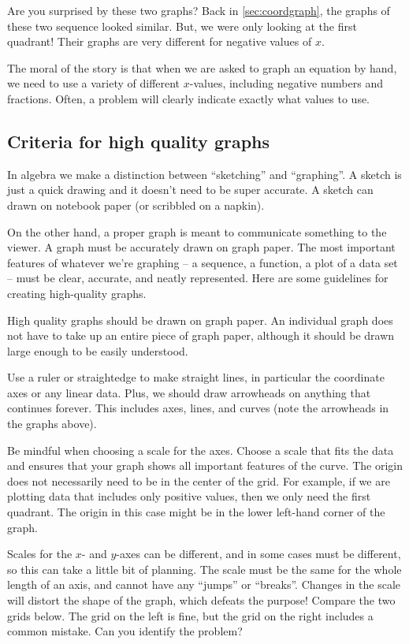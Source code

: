 Are you surprised by these two graphs? Back in \cref{sec:coordgraph}, the graphs of these two sequence looked similar. But, we were only looking at the first quadrant! Their graphs are very different for negative values of $x$.

The moral of the story is that when we are asked to graph an equation by hand, we need to use a variety of different $x$-values, including negative numbers and fractions. Often, a problem will clearly indicate exactly what values to use.

\subsection{Criteria for high quality graphs}

In algebra we make a distinction between ``sketching'' and ``graphing''. A sketch is just a quick drawing and it doesn't need to be super accurate. A sketch can drawn on notebook paper (or scribbled on a napkin).

On the other hand, a proper graph is meant to communicate something to the viewer. A graph must be accurately drawn on graph paper. The most important features of whatever we're graphing -- a sequence, a function, a plot of a data set -- must be clear, accurate, and neatly represented. Here are some guidelines for creating high-quality graphs.

High quality graphs should be drawn on graph paper. An individual graph does not have to take up an entire piece of graph paper, although it should be drawn large enough to be easily understood.

Use a ruler or straightedge to make straight lines, in particular the coordinate axes or any linear data. Plus, we should draw arrowheads on anything that continues forever. This includes axes, lines, and curves (note the arrowheads in the graphs above).

Be mindful when choosing a scale for the axes. Choose a scale that fits the data and ensures that your graph shows all important features of the curve. The origin does not necessarily need to be in the center of the grid. For example, if we are plotting data that includes only positive values, then we only need the first quadrant. The origin in this case might be in the lower left-hand corner of the graph.

Scales for the $x$- and $y$-axes can be different, and in some cases must be different, so this can take a little bit of planning. The scale must be the same for the whole length of an axis, and cannot have any ``jumps'' or ``breaks''. Changes in the scale will distort the shape of the graph, which defeats the purpose! Compare the two grids below. The grid on the left is fine, but the grid on the right includes a common mistake. Can you identify the problem?

